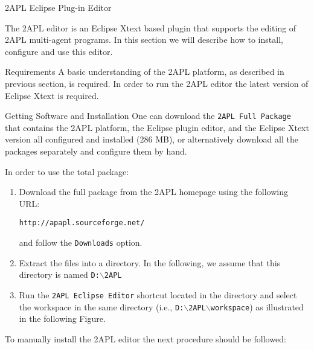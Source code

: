\begin{chapter}{2APL Eclipse Plug-in Editor} \label{chap:eclipse}

The 2APL editor is an Eclipse Xtext based plugin that supports the
editing of 2APL multi-agent programs. In this section we will
describe how to install, configure and use this editor.

\begin{section}{Requirements}
A basic understanding of the 2APL platform, as described in previous
section, is required. In order to run the 2APL editor the latest
version of Eclipse Xtext is required.
\end{section}

\begin{section}{Getting Software and Installation}
One can download the {\tt 2APL Full Package} that contains the 2APL
platform, the Eclipse plug\-in editor, and the Eclipse Xtext version
all configured and installed (286 MB), or alternatively download all
the packages separately and configure them by hand.

In order to use the total package:
\begin{enumerate}

    \item Download the full package from the 2APL homepage using the
    following URL:
    \begin{center}
    {\tt http://apapl.sourceforge.net/}
    \end{center}
    and follow the {\tt Downloads} option.

    \item Extract the files into a directory. In the following, we assume that this directory is named \texttt{D:$\backslash$2APL}

    \item Run the \texttt{2APL Eclipse Editor} shortcut located in the
    directory and select the workspace in the same directory (i.e.,
    \texttt{D:$\backslash$2APL$\backslash$workspace}) as illustrated in the following
    Figure.
        \begin{figure}[ht]
            \begin{center}
            \end{center}\label{fig:workspace}
        \end{figure}
\end{enumerate}

To manually install the 2APL editor the next procedure should be
followed:


\end{section}
\end{chapter}

